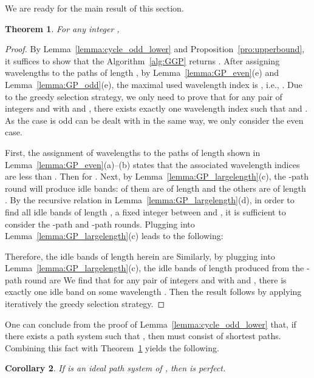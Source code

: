 \documentclass[journal,draftcls,onecolumn,12pt,twoside]{IEEEtran}
\newtheorem{theorem}{\bf Theorem}
\newtheorem{corollary}[theorem]{\bf Corollary}
\begin{document}
\medskip

We are ready for the main result of this section. 

\begin{theorem}\label{th:cycle_odd_optimal}
For any integer , 
\end{theorem}
\begin{proof}
By Lemma~\ref{lemma:cycle_odd_lower} and Proposition~\ref{pro:upperbound}, it suffices to show that the Algorithm~\ref{alg:GGP} returns .
After assigning wavelengths to the paths of length , by Lemma~\ref{lemma:GP_even}(e) and Lemma~\ref{lemma:GP_odd}(e), the maximal used wavelength index is , i.e., .
Due to the greedy selection strategy, we only need to prove that for any pair of integers  and  with  and , there exists exactly one wavelength index  such that  and .
As the case  is odd can be dealt with in the same way, we only consider the even case.

First, the assignment of wavelengths to the paths of length  shown in Lemma~\ref{lemma:GP_even}(a)--(b) states that the associated wavelength indices are less than .
Then  for .
Next, by Lemma~\ref{lemma:GP_largelength}(c), the -path round will produce  idle bands:  of them are of length  and the others are of length .
By the recursive relation in Lemma~\ref{lemma:GP_largelength}(d), in order to find all idle bands of length , a fixed integer between  and , it is sufficient to consider the -path and -path rounds.
Plugging  into Lemma~\ref{lemma:GP_largelength}(c) leads to the following:

Therefore, the  idle bands of length  herein are 
Similarly, by plugging  into Lemma~\ref{lemma:GP_largelength}(c), the  idle bands of length  produced from the -path round are 
We find that for any pair of integers  and  with  and , there is exactly one idle band  on some wavelength .
Then the result follows by applying iteratively the greedy selection strategy.
\end{proof}

One can conclude from the proof of Lemma~\ref{lemma:cycle_odd_lower} that, if there exists a path system  such that , then  must consist of shortest paths.
Combining this fact with Theorem~\ref{th:cycle_odd_optimal} yields the following.

\begin{corollary}\label{coro:odd}
If  is an ideal path system of , then  is perfect.
\end{corollary}
\end{document}
